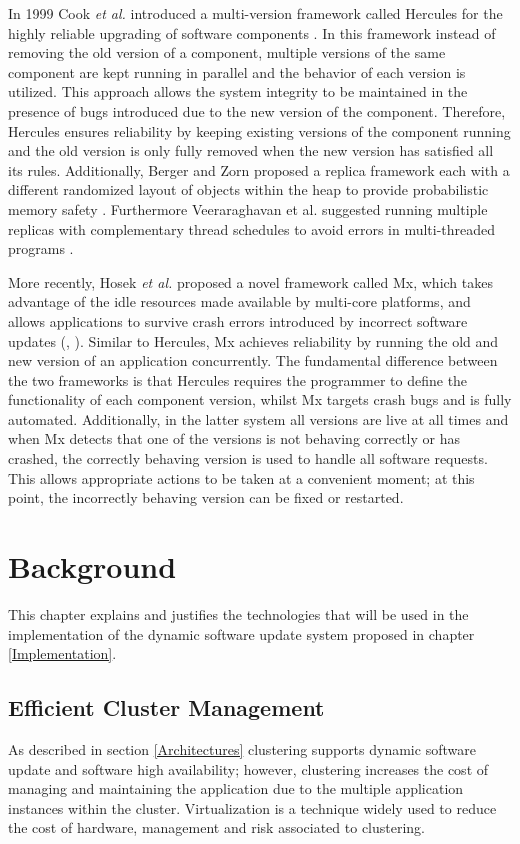 \documentclass[a4paper,11pt,twoside]{report}
\begin{document}
In 1999 Cook \textit{et al.} introduced a multi-version framework called Hercules for the highly reliable upgrading of software components \cite{Cook}. In this framework instead of removing the old version of a component, multiple versions of the same component are kept running in parallel and the behavior of each version is utilized. This approach allows the system integrity to be maintained in the presence of bugs introduced due to the new version of the component. Therefore, Hercules ensures reliability by keeping existing versions of the component running and the old version is only fully removed when the new version has satisfied all its rules. Additionally, Berger and Zorn proposed a replica framework each with a different randomized layout of objects within the heap to provide probabilistic memory safety \cite{Berger}. Furthermore Veeraraghavan et al. suggested running multiple replicas with complementary thread schedules to avoid errors in multi-threaded programs \cite{Veeraraghavan}. 

More recently, Hosek \textit{et al.} proposed a novel framework called Mx, which takes advantage of the idle resources made available by multi-core platforms, and allows applications to survive crash errors introduced by incorrect software updates (\cite{Cadar1}, \cite{Cadar2}). Similar to Hercules, Mx achieves reliability by running the old and new version of an application concurrently. The fundamental difference between the two frameworks is that Hercules requires the programmer to define the functionality of each component version, whilst Mx targets crash bugs and is fully automated. Additionally, in the latter system all versions are live at all times and when Mx detects that one of the versions is not behaving correctly or has crashed, the correctly behaving version is used to handle all software requests. This allows appropriate actions to be taken at a convenient moment; at this point, the incorrectly behaving version can be fixed or restarted. 
\clearpage

\chapter{Background}
This chapter explains and justifies the technologies that will be used in the implementation of the dynamic software update system proposed in chapter \ref{Implementation}.
 
\section{Efficient Cluster Management} 
As described in section \ref{Architectures} clustering supports dynamic software update and software high availability; however, clustering increases the cost of managing and maintaining the application due to the multiple application instances within the cluster. Virtualization is a technique widely used to reduce the cost of hardware, management and risk associated to clustering.
\end{document}
